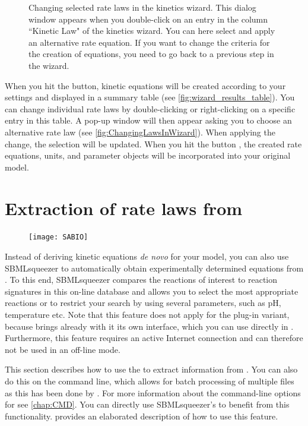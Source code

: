 \begin{figure}
\caption[Changing selected rate laws in the kinetics wizard]{Changing selected rate laws in the kinetics wizard.
This dialog window appears when you double-click on an entry in the column ``Kinetic Law" of the kinetics wizard.
You can here select and apply an alternative rate equation.
If you want to change the criteria for the creation of equations, you need to go back to a previous step in the wizard.}
\label{fig:ChangingLawsInWizard}
\end{figure}

When you hit the  button, kinetic equations will be created according to your settings and displayed in a summary table (see \vref{fig:wizard_results_table}).
You can change individual rate laws by double-clicking or right-clicking on a specific entry in this table.
A pop-up window will then appear asking you to choose an alternative rate law (see \vref{fig:ChangingLawsInWizard}).
When applying the change, the selection will be updated.
When you hit the button , the created rate equations, units, and parameter objects will be incorporated into your original model.

\section{Extraction of rate laws from \SABIO}

\begin{figure}
\vspace{\wrapfigspace}
\texttt{[image: SABIO]}
\end{figure}
Instead of deriving kinetic equations \emph{de novo} for your model, you can also use SBMLsqueezer to automatically obtain experimentally determined equations from \SABIO.
To this end, SBMLsqueezer compares the reactions of interest to reaction signatures in this on-line database and allows you to select the most appropriate reactions or to restrict your search by using several parameters, such as pH, temperature etc.
Note that this feature does not apply for the \CellDesigner plug-in variant,
because \CellDesigner brings already with it its own \SABIO interface, which you can use directly in \CellDesigner.
Furthermore, this feature requires an active Internet connection and can therefore not be used in an off-line mode.

This section describes how to use the \GUI to extract information from \SABIO.
You can also do this on the command line, which allows for batch processing of multiple \SBML files as this has been done by \citet{Buechel2013}.
For more information about the command-line options for \SABIO see \vref{chap:CMD}.
You can directly use SBMLsqueezer's \API to benefit from this functionality.  provides an elaborated description of how to use this feature.

